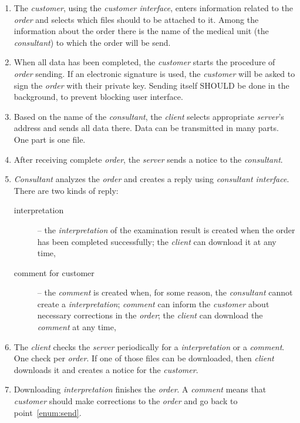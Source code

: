 \documentclass[a4paper]{article}
\begin{document}
\begin{enumerate}
  \item The \emph{customer}, using the \emph{customer interface}, enters information
  related to the \emph{order} and selects which files should to be attached to it.
  Among the information about the order there is the name of the medical unit
  (the \emph{consultant}) to which the order will be send.

  \item \label{enum:send} When all data has been completed, the \emph{customer} starts the
  procedure of \emph{order} sending. If an electronic signature is used, the
  \emph{customer} will be asked to sign the \emph{order} with their private key. Sending
  itself SHOULD be done in the background, to prevent blocking user interface. 
  
  \item Based on the name of the \emph{consultant}, the \emph{client} selects 
  appropriate \emph{server}’s address and sends all data there. Data can be transmitted in
  many parts. One part is one file.

  \item After receiving complete \emph{order}, the \emph{server} sends a notice to the
  \emph{consultant}.

  \item \emph{Consultant} analyzes the \emph{order} and creates a reply using 
  \emph{consultant interface}. There are two kinds of reply:
  \begin{description}
    \item[interpretation] -- the \emph{interpretation} of the examination result is created
    when the order has been completed successfully; the \emph{client} can
    download it at any time,
    \item[comment for customer] -- the \emph{comment} is created when, for some reason, the
    \emph{consultant} cannot create a \emph{interpretation};
    \emph{comment} can inform the \emph{customer} about necessary
    corrections in the \emph{order}; the \emph{client} can download the \emph{comment} 
    at any time,
  \end{description}

  \item The \emph{client} checks the \emph{server} periodically for a \emph{interpretation}
  or a \emph{comment}. One check per \emph{order}. If one of those files can be downloaded,
  then \emph{client} downloads it and creates a notice for the \emph{customer}.
 
  \item Downloading \emph{interpretation} finishes the \emph{order}. A \emph{comment} means
  that \emph{customer} should make corrections to the \emph{order} and go back to
  \mbox{point \ref{enum:send}}.
\end{enumerate}
\end{document}
